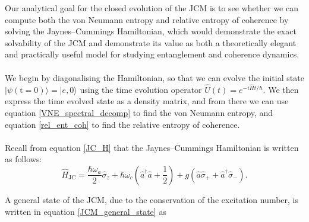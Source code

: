 \documentclass[11pt]{article}
\begin{document}
Our analytical goal for the closed evolution of the JCM is to see whether we can compute both the von Neumann entropy and relative entropy of coherence by solving the Jaynes--Cummings Hamiltonian, which would demonstrate the exact solvability of the JCM and demonstrate its value as both a theoretically elegant and practically useful model for studying entanglement and coherence dynamics.\\
\\
We begin by diagonalising the Hamiltonian, so that we can evolve the initial state $|\psi (\text{t}=0)\rangle = |e, 0\rangle$ using the time evolution operator $\hat{U}(t) = e^{-i\hat{H}t/\hbar}$. We then express the time evolved state as a density matrix, and from there we can use equation \eqref{VNE_spectral_decomp} to find the von Neumann entropy, and equation \eqref{rel_ent_coh} to find the relative entropy of coherence.\\
\\
Recall from equation \eqref{JC_H} that the Jaynes--Cummings Hamiltonian is written as follows:
\begin{equation*}
        \hat{H}_{\scriptscriptstyle \text{JC}} = \frac{\hbar\omega_a}{2}\hat{\sigma}_z + \hbar\omega_c\left(\hat{a}^\dagger \hat{a} + \frac{1}{2} \right) + g(\hat{a}\hat{\sigma}_{+} + \hat{a}^\dagger\hat{\sigma}_{-}).
\end{equation*}

A general state of the JCM, due  to the conservation of the excitation number, is written in equation \eqref{JCM_general_state} as
\end{document}
